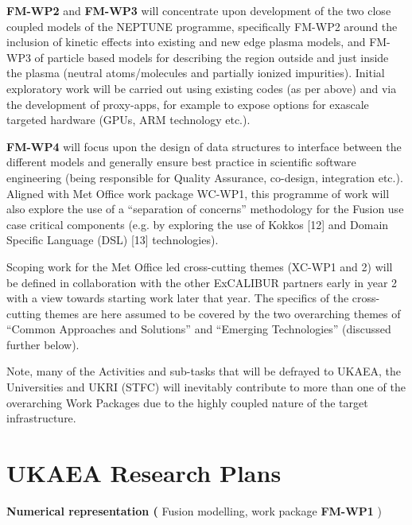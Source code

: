 \documentclass{article}
\begin{document}
\vspace{24pt}
\textbf{FM-WP2} and \textbf{FM-WP3} will concentrate upon development of the two 
close coupled models of the NEPTUNE programme, specifically FM-WP2 around the inclusion 
of kinetic effects into existing and new edge plasma models, and FM-WP3 of particle 
based models for describing the region outside and just inside the plasma (neutral 
atoms/molecules and partially ionized impurities). Initial exploratory work will 
be carried out using existing codes (as per above) and via the development of proxy-apps, 
for example to expose options for exascale targeted hardware (GPUs, ARM technology 
etc.).

\vspace{24pt}
\textbf{FM-WP4} will focus upon the design of data structures to interface between 
the different models and generally ensure best practice in scientific software 
engineering (being responsible for Quality Assurance, co-design, integration etc.). 
Aligned with Met Office work {\color{color29} package WC-WP1, this programme of 
work will also explore the use of a ``separation of concerns'' methodology for 
the Fusion use case critical components (e.g. by exploring the use of Kokkos [12] 
and Domain Specific Language (DSL) [13] technologies}).

\vspace{24pt}
Scoping work for the Met Office led cross-cutting themes (XC-WP1 and 2) will be 
defined in collaboration with the other ExCALIBUR partners early in year 2 with 
a view towards starting work later that year. The specifics of the cross-cutting 
themes are here assumed to be covered by the two overarching themes of ``Common 
Approaches and Solutions'' and ``Emerging Technologies'' (discussed further below).

\vspace{24pt}
Note, many of the Activities and sub-tasks that will be defrayed to UKAEA, the 
Universities and UKRI (STFC) will inevitably contribute to more than one of the 
overarching Work Packages due to the highly coupled nature of the target infrastructure.

\vspace{24pt}
\section*{{\huge{}{\color{color25} \textbf{UKAEA Research Plans}}}}

\vspace{24pt}
{\color{color25} \textbf{Numerical representation (}}{\color{color25} Fusion modelling, 
work package }{\color{color25} \textbf{FM-WP1}}{\color{color25} )}
\end{document}
